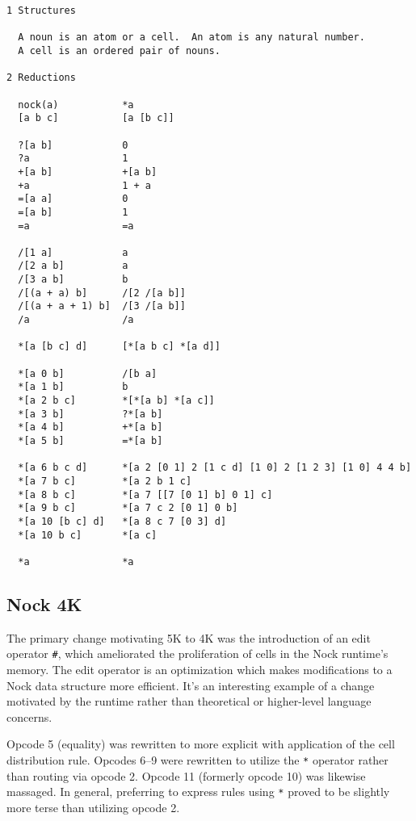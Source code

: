 \documentclass[twoside]{article}
\begin{document}
\begin{lstlisting}[label=lst:nock5k,caption={Nock 5K, 24 September 2012.},style=listingcode]
1 Structures

  A noun is an atom or a cell.  An atom is any natural number.
  A cell is an ordered pair of nouns.

2 Reductions

  nock(a)           *a
  [a b c]           [a [b c]]

  ?[a b]            0
  ?a                1
  +[a b]            +[a b]
  +a                1 + a
  =[a a]            0
  =[a b]            1
  =a                =a

  /[1 a]            a
  /[2 a b]          a
  /[3 a b]          b
  /[(a + a) b]      /[2 /[a b]]
  /[(a + a + 1) b]  /[3 /[a b]]
  /a                /a

  *[a [b c] d]      [*[a b c] *[a d]]

  *[a 0 b]          /[b a]
  *[a 1 b]          b
  *[a 2 b c]        *[*[a b] *[a c]]
  *[a 3 b]          ?*[a b]
  *[a 4 b]          +*[a b]
  *[a 5 b]          =*[a b]

  *[a 6 b c d]      *[a 2 [0 1] 2 [1 c d] [1 0] 2 [1 2 3] [1 0] 4 4 b]
  *[a 7 b c]        *[a 2 b 1 c]
  *[a 8 b c]        *[a 7 [[7 [0 1] b] 0 1] c]
  *[a 9 b c]        *[a 7 c 2 [0 1] 0 b]
  *[a 10 [b c] d]   *[a 8 c 7 [0 3] d]
  *[a 10 b c]       *[a c]

  *a                *a
\end{lstlisting}

\subsection{Nock 4K}

The primary change motivating 5K to 4K was the introduction of an edit operator \texttt{#}, which ameliorated the proliferation of cells in the Nock runtime's memory.  The edit operator is an optimization which makes modifications to a Nock data structure more efficient.  It's an interesting example of a change motivated by the runtime rather than theoretical or higher-level language concerns.

Opcode 5 (equality) was rewritten to more explicit with application of the cell distribution rule.  Opcodes 6–9 were rewritten to utilize the \texttt{*} operator rather than routing via opcode 2.  Opcode 11 (formerly opcode 10) was likewise massaged.  In general, preferring to express rules using \texttt{*} proved to be slightly more terse than utilizing opcode 2.
\end{document}
